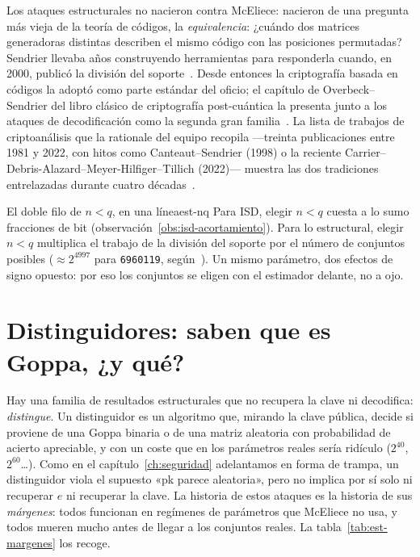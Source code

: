 \documentclass[11pt,a4paper,oneside]{report}
\begin{document}
\begin{historia}
Los ataques estructurales no nacieron contra McEliece: nacieron de
una pregunta más vieja de la teoría de códigos, la
\emph{equivalencia}: ¿cuándo dos matrices generadoras distintas
describen el mismo código con las posiciones permutadas? Sendrier
llevaba años construyendo herramientas para responderla cuando, en
2000, publicó la división del soporte~\cite{sendrier2000}. Desde
entonces la criptografía basada en códigos la adoptó como parte
estándar del oficio; el capítulo de Overbeck--Sendrier del libro
clásico de criptografía post-cuántica la presenta junto a los ataques
de decodificación como la segunda gran familia~\cite{overbeck2009}.
La lista de trabajos de criptoanálisis que la rationale del equipo
recopila ---treinta publicaciones entre 1981 y 2022, con hitos como
Canteaut--Sendrier (1998) o la reciente
Carrier--Debris-Alazard--Meyer-Hilfiger--Tillich (2022)--- muestra
las dos tradiciones entrelazadas durante cuatro
décadas~\cite{cmrationale,canteautsendrier1998,carrier2022}.
\end{historia}

\begin{observacion}{El doble filo de $n<q$, en una línea}{est-nq}
Para ISD, elegir $n<q$ cuesta a lo sumo fracciones de bit
(observación~\ref{obs:isd-acortamiento}). Para lo estructural,
elegir $n<q$ multiplica el trabajo de la división del soporte por el
número de conjuntos posibles ($\approx 2^{4997}$ para
\texttt{6960119}, según~\cite{cmrationale}). Un mismo parámetro,
dos efectos de signo opuesto: por eso los conjuntos se eligen con el
estimador delante, no a ojo.
\end{observacion}

\section{Distinguidores: saben que es Goppa, ¿y qué?}\label{sec:est-distinguidores}

Hay una familia de resultados estructurales que no recupera la
clave ni decodifica: \emph{distingue}. Un distinguidor es un
algoritmo que, mirando la clave pública, decide si proviene de una
Goppa binaria o de una matriz aleatoria con probabilidad de acierto
apreciable, y con un coste que en los parámetros reales sería
ridículo ($2^{40}$, $2^{60}$\dots). Como en el capítulo~\ref{ch:seguridad}
adelantamos en forma de trampa, un distinguidor viola el supuesto
«pk parece aleatoria», pero no implica por sí solo ni recuperar $e$
ni recuperar la clave. La historia de estos ataques es la historia de
sus \emph{márgenes}: todos funcionan en regímenes de parámetros que
McEliece no usa, y todos mueren mucho antes de llegar a los
conjuntos reales. La tabla~\ref{tab:est-margenes} los recoge.
\end{document}
